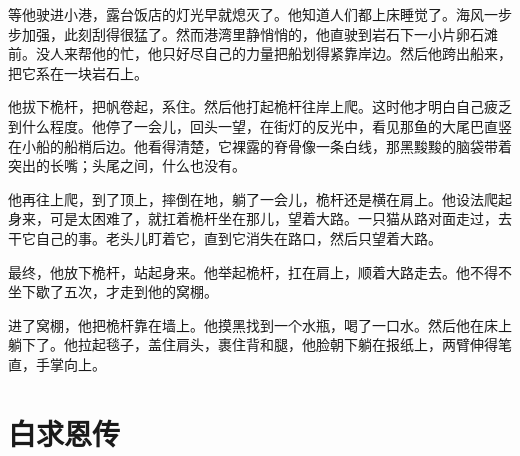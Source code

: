 \documentclass[12pt,UTF-8,openany]{ctexbook}
\begin{document}
\begin{normalsize}
    等他驶进小港，露台饭店的灯光早就熄灭了。他知道人们都上床睡觉了。海风一步步加强，此刻刮得很猛了。然而港湾里静悄悄的，他直驶到岩石下一小片卵石滩前。没人来帮他的忙，他只好尽自己的力量把船划得紧靠岸边。然后他跨出船来，把它系在一块岩石上。
    
    他拔下桅杆，把帆卷起，系住。然后他打起桅杆往岸上爬。这时他才明白自己疲乏到什么程度。他停了一会儿，回头一望，在街灯的反光中，看见那鱼的大尾巴直竖在小船的船梢后边。他看得清楚，它裸露的脊骨像一条白线，那黑黢黢的脑袋带着突出的长嘴；头尾之间，什么也没有。
    
    他再往上爬，到了顶上，摔倒在地，躺了一会儿，桅杆还是横在肩上。他设法爬起身来，可是太困难了，就扛着桅杆坐在那儿，望着大路。一只猫从路对面走过，去干它自己的事。老头儿盯着它，直到它消失在路口，然后只望着大路。
    
    最终，他放下桅杆，站起身来。他举起桅杆，扛在肩上，顺着大路走去。他不得不坐下歇了五次，才走到他的窝棚。
    
    进了窝棚，他把桅杆靠在墙上。他摸黑找到一个水瓶，喝了一口水。然后他在床上躺下了。他拉起毯子，盖住肩头，裹住背和腿，他脸朝下躺在报纸上，两臂伸得笔直，手掌向上。
    
\end{normalsize}



\chapter{白求恩传}
\end{document}
